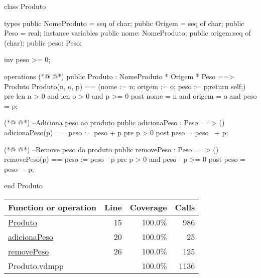 \begin{vdmpp}[breaklines=true]
class Produto

types
 public NomeProduto = seq of char;
 public Origem = seq of char;
 public Peso = real;
instance variables
  public nome: NomeProduto;
  public origem:seq of (char);
  public peso: Peso;
  
  inv peso >= 0;

operations
(*@
\label{Produto:15}
@*)
  public  Produto : NomeProduto * Origem * Peso ==> Produto
  Produto(n, o, p) == (nome := n; origem := o; peso := p;return self;)
  pre len n > 0 and len o > 0 and p >= 0
  post nome = n and origem = o and peso = p;
  
(*@
\label{adicionaPeso:20}
@*)
  --Adiciona peso ao produto
  public  adicionaPeso : Peso ==> ()
  adicionaPeso(p) == peso := peso + p
  pre p > 0
  post peso = peso~ + p;
  
(*@
\label{removePeso:26}
@*)
 --Remove peso do produto
  public  removePeso : Peso ==> ()
  removePeso(p) == peso := peso - p
  pre p > 0 and peso - p >= 0
  post peso = peso~ - p;


end Produto
\end{vdmpp}
\bigskip
\begin{longtable}{|l|r|r|r|}
\hline
Function or operation & Line & Coverage & Calls \\
\hline
\hline
\hyperref[Produto:15]{Produto} & 15&100.0\% & 986 \\
\hline
\hyperref[adicionaPeso:20]{adicionaPeso} & 20&100.0\% & 25 \\
\hline
\hyperref[removePeso:26]{removePeso} & 26&100.0\% & 125 \\
\hline
\hline
Produto.vdmpp & & 100.0\% & 1136 \\
\hline
\end{longtable}

